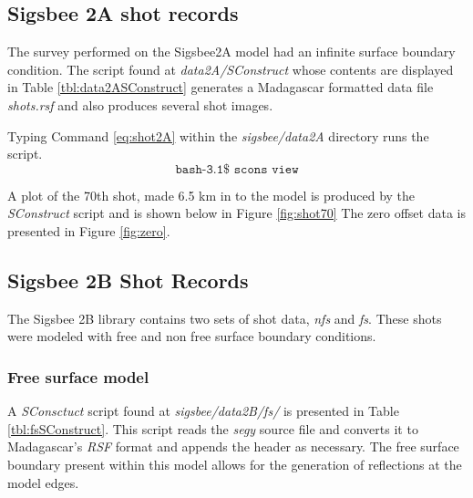 \subsection{Sigsbee 2A shot records}
The survey performed on the Sigsbee2A model had an infinite surface boundary condition.  The script found at 
\emph{data2A/SConstruct} whose contents are displayed in Table \ref{tbl:data2ASConstruct} generates a Madagascar 
formatted data file \emph{shots.rsf} and also produces several shot images. 
  
{
\tiny

\normalsize
}

Typing Command \ref{eq:shot2A} within the \emph{sigsbee/data2A} directory runs the script.
\begin{equation}\label{eq:shot2A} \texttt{bash-3.1\$\ scons\ view} \end{equation}

A plot of the 70th shot, made 6.5 km in to the model is produced by the \emph{SConstruct} script and is shown below in Figure \ref{fig:shot70}  The zero offset data is presented in Figure \ref{fig:zero}.


\subsection{Sigsbee 2B Shot Records}
The Sigsbee 2B library contains two sets of shot data, \emph{nfs} and \emph{fs}.  These shots were modeled with free and non free surface 
boundary conditions.  

\subsubsection{Free surface model}  
A \emph{SConsctuct} script found at \textit{sigsbee/data2B/fs/} is presented in Table \ref{tbl:fsSConstruct}.  
This script reads the \emph{segy} source file and converts it to Madagascar's \emph{RSF} format and appends the header as 
necessary.  The free surface boundary present within this model allows for the generation of reflections at the model edges.  

{
\tiny

\normalsize
}


